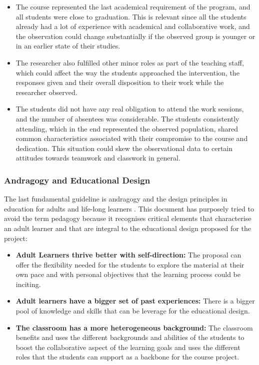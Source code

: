 \begin{itemize}
    \item The course represented the last academical requirement of the program, and all students were close to graduation. This is relevant since all the students already had a
    lot of experience with academical and collaborative work, and the observation could change substantially if the observed group is younger or in an earlier state of their studies.
    \item The researcher also fulfilled other minor roles as part of the teaching staff, which could affect the way the students approached the intervention, the responses given
    and their overall disposition to their work while the researcher observed.
    \item The students did not have any real obligation to attend the work sessions, and the number of absentees was considerable. The students consistently attending, which in the
    end represented the observed population, shared common characteristics associated with their compromise to the course and dedication. This situation could skew the observational
    data to certain attitudes towards teamwork and classwork in general.
\end{itemize}

\subsubsection{Andragogy and Educational Design \label{sec:3-3-1-3}}

The last fundamental guideline is andragogy and the design principles in education for adults and life-long learners \parencite{knowles_2014}. This document has purposely tried to
avoid the term pedagogy because it recognises critical elements that characterise an adult learner and that are integral to the educational design proposed for the project:
\begin{itemize}
    \item \textbf{Adult Learners thrive better with self-direction:} The proposal can offer the flexibility needed for the students to explore the material at their own
    pace and with personal objectives that the learning process could be inciting.
    \item \textbf{Adult learners have a bigger set of past experiences:} There is a bigger pool of knowledge and skills that can be leverage for the educational design.
    \item \textbf{The classroom has a more heterogeneous background: } The classroom benefits and uses the different backgrounds and abilities of the students to boost the
    collaborative aspect of the learning goals and uses the different roles that the students can support as a backbone for the course project.
\end{itemize}

